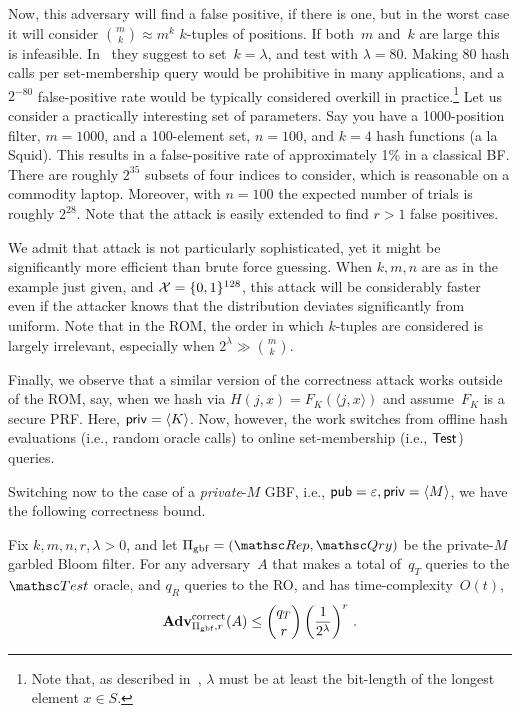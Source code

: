 Now, this adversary will find a false positive, if there is one, but in the worst case it will consider
$\binom{m}{k} \approx m^k$ $k$-tuples of positions.  If both~$m$
and~$k$ are large this is infeasible.  In~\cite{dong2013private} they suggest to
set~$k=\lambda$, and test with $\lambda=80$.  Making 80 hash calls per
set-membership query would be prohibitive in many applications, and a
$2^{-80}$ false-positive rate would be typically considered overkill in
practice.\footnote{Note
that, as described in~\cite{xxx}, $\lambda$ must be at least the
bit-length of the longest element $x \in S$. }
Let us consider a practically interesting set of parameters. Say you have a 1000-position
filter, $m=1000$, and a 100-element set, $n=100$,  and $k=4$ hash
functions (a la Squid\cite{fan2000summary}).  This results in a false-positive rate of
approximately 1\% in a classical BF.  There are roughly $2^{35}$
subsets of four indices to consider, which is reasonable on a
commodity laptop.  Moreover, with $n=100$ the expected
number of trials is roughly $2^{28}$.
Note that the attack is easily extended to find $r>1$ false positives.

We admit that attack is not particularly sophisticated, yet it might
be significantly more efficient than brute force guessing.  When $k,m,n$ are as in the example just given, and ${\cal X}=\{0,1\}^{128}$,
this attack will be considerably faster even if the attacker knows that the distribution deviates significantly from uniform.   Note that in the ROM, the order in which $k$-tuples are considered is largely irrelevant, especially when $2^\lambda \gg \binom{m}{k}$.

Finally, we observe that a similar version of the correctness attack
works outside of the ROM, say, when we hash via $H(j,x)=F_K(\langle
j,x \rangle)$ and assume~$F_K$ is a secure PRF.  Here,
${\sf priv}=\langle K \rangle$.  Now,
however, the work switches from offline hash evaluations (i.e., random
oracle calls) to online set-membership (i.e., $\mathsf{Test}$) queries.


Switching now to the case of a \emph{private}-$M$ GBF, i.e., ${\sf pub}=\varepsilon, {\sf priv}=\langle M \rangle$, we have the
following correctness bound.

\begin{theorem}\label{thm:gbf-correctness}
Fix $k,m,n,r,\lambda>0$, and let $\setprim_{\mathrm{gbf}}=(\Rep, \Qry)$ be the private-$M$ garbled Bloom filter. For any adversary~$A$ that makes a total of~$q_T$ queries to the $\Test$ oracle, and $q_R$ queries to the RO, and has time-complexity~$O(t)$,
\[
\mathrm{\mathbf{Adv}}^{\mathrm{correct}}_{\Pi_{\mathrm{gbf}},r}(A) \leq  {\dbinom{q_T}{r}} \left( \dfrac{1}{2^{\lambda}} \right)^r\,.
\]
\end{theorem}

